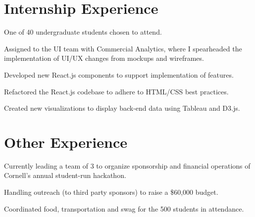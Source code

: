 \documentclass[]{deedy-resume-openfont}
\begin{document}
\begin{minipage}[t]{0.66\textwidth} 


\section{Internship Experience}

\vspace{\topsep} %
\begin{tightemize}
\item One of 40 undergraduate students chosen to attend.
\end{tightemize}
\sectionsep

\begin{tightemize}
\item Assigned to the UI team with Commercial Analytics, where I spearheaded the implementation of UI/UX changes from mockups and wireframes.
\item Developed new React.js components to support implementation of features.
\item Refactored the React.js codebase to adhere to HTML/CSS best practices.
\item Created new visualizations to display back-end data using Tableau and D3.js.
\end{tightemize}
\sectionsep


\section{Other Experience}

\begin{tightemize}
\item Currently leading a team of 3 to organize sponsorship and financial operations of Cornell's annual student-run hackathon.
\item Handling outreach (to third party sponsors) to raise a \$60,000 budget.
\item Coordinated food, transportation and swag for the 500 students in attendance.
\end{tightemize}
\sectionsep


\end{minipage}
\end{document}
